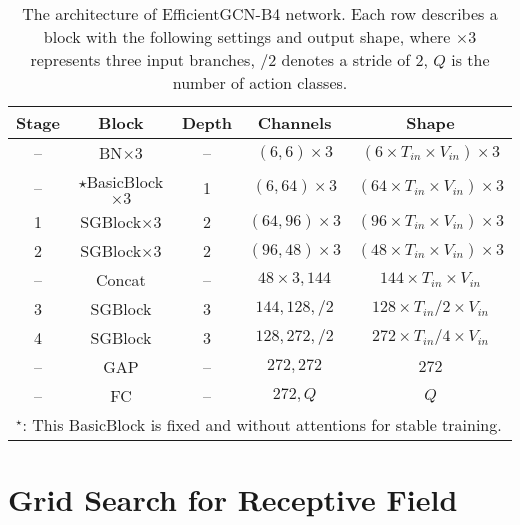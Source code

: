 \documentclass[10pt,journal,compsoc]{IEEEtran}
\begin{document}
\begin{table}[ht]
  \caption{The architecture of EfficientGCN-B4 network. Each row describes a block with the following settings and output shape, where $\times3$ represents three input branches, $/2$ denotes a stride of 2, $Q$ is the number of action classes.}
  \label{tab:architecture4}
  \vspace{-0.4cm}
  \centering
  \setlength{\tabcolsep}{4pt}
  \renewcommand{\arraystretch}{1.2}
  \begin{tabular}{ccccc}
  \toprule
  Stage & Block & Depth & Channels & Shape \\
  \midrule
  -- & BN$\times3$ & -- & $(6,6)\times3$ & $(6\times T_{in}\times V_{in})\times3$ \\
  -- & $\star$BasicBlock$\times3$ & 1 & $(6,64)\times3$ & $(64\times T_{in}\times V_{in})\times3$ \\
  \hline
  1 & SGBlock$\times3$ & 2 & $(64,96)\times3$ & $(96\times T_{in}\times V_{in})\times3$ \\
  2 & SGBlock$\times3$ & 2 & $(96,48)\times3$ & $(48\times T_{in}\times V_{in})\times3$ \\
  \hline
  -- & Concat & -- & $48\times3, 144$ & $144\times T_{in}\times V_{in}$ \\
  \hline
  3 & SGBlock & 3 & $144,128,/2$ & $128\times T_{in}/2\times V_{in}$ \\
  4 & SGBlock & 3 & $128,272,/2$ & $272\times T_{in}/4\times V_{in}$ \\
  \hline
  -- & GAP & -- & $272,272$ & $272$ \\
  \hline
  -- & FC & -- & $272,Q$ & $Q$ \\
  \bottomrule
  \multicolumn{5}{l}{$^\star$: This BasicBlock is fixed and without attentions for stable training.}\\
  \end{tabular}
\end{table}

\section{Grid Search for Receptive Field}
\label{asec:receptive}
\end{document}
